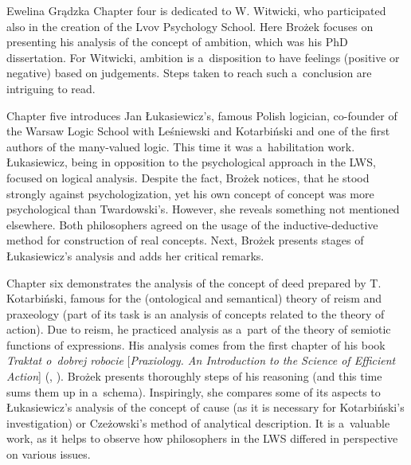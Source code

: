 \begin{newrevengenv}{Ewelina Grądzka}
Chapter four is dedicated to W. Witwicki, who participated also in the creation of the Lvov Psychology School. Here Brożek focuses on presenting his analysis of the concept of ambition, which was his PhD dissertation. For Witwicki, ambition is a~disposition to have feelings (positive or negative) based on judgements. Steps taken to reach such a~conclusion are intriguing to read.

Chapter five introduces Jan Łukasiewicz's, famous Polish logician, co-founder of the Warsaw Logic School with Leśniewski and Kotarbiński and one of the first authors of the many-valued logic. This time it was a~habilitation work. Łukasiewicz, being in opposition to the psychological approach in the LWS, focused on logical analysis. Despite the fact, Brożek notices, that he stood strongly against psychologization, yet his own concept of concept was more psychological than Twardowski's. However, she reveals something not mentioned elsewhere. Both philosophers agreed on the usage of the inductive-deductive method for construction of real concepts. Next, Brożek presents stages of Łukasiewicz's analysis and adds her critical remarks.

Chapter six demonstrates the analysis of the concept of deed prepared by T. Kotarbiński, famous for the (ontological and semantical) theory of reism and praxeology (part of its task is an analysis of concepts related to the theory of action). Due to reism, he practiced analysis as a~part of the theory of semiotic functions of expressions. His analysis comes from the first chapter of his book \textit{Traktat o~dobrej robocie} [\textit{Praxiology. An Introduction to the Science of Efficient Action}]
(\cite[][]{kotarbinski_traktat_1958}, \cite*[Eng. transl.][]{kotarbinski_praxiology_1965}). %
 Brożek presents thoroughly steps of his reasoning (and this time sums them up in a~schema). Inspiringly, she compares some of its aspects to Łukasiewicz's analysis of the concept of cause (as it is necessary for Kotarbiński's investigation) or Czeżowski's method of analytical description. It is a~valuable work, as it helps to observe how philosophers in the LWS differed in perspective on various issues.


\end{newrevengenv}
